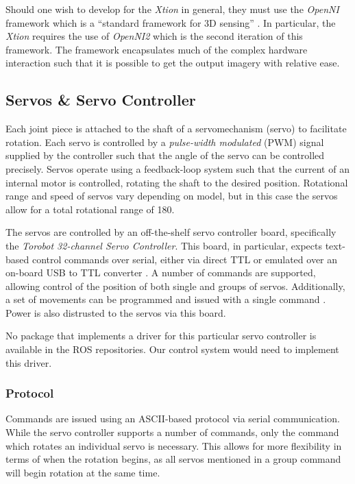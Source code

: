 Should one wish to develop for the \emph{Xtion} in general, they must use the \emph{OpenNI} framework which is a ``standard framework for 3D sensing'' \cite{openni_site}. In particular, the \emph{Xtion} requires the use of \emph{OpenNI2} which is the second iteration of this framework. The framework encapsulates much of the complex hardware interaction such that it is possible to get the output imagery with relative ease. 

\subsection{Servos \& Servo Controller}
Each joint piece is attached to the shaft of a servomechanism (servo) to facilitate rotation. Each servo is controlled by a \emph{pulse-width modulated} (PWM) signal supplied by the controller such that the angle of the servo can be controlled precisely. Servos operate using a feedback-loop system such that the current of an internal motor is controlled, rotating the shaft to the desired position. Rotational range and speed of servos vary depending on model, but in this case the servos allow for a total rotational range of 180\textdegree.

The servos are controlled by an off-the-shelf servo controller board, specifically the \emph{Torobot 32-channel Servo Controller}. This board, in particular, expects text-based control commands over serial, either via direct TTL or emulated over an on-board USB to TTL converter \cite{torobot_manual}. A number of commands are supported, allowing control of the position of both single and groups of servos. Additionally, a set of movements can be programmed and issued with a single command \cite{torobot_manual}. Power is also distrusted to the servos via this board.

No package that implements a driver for this particular servo controller is available in the ROS repositories. Our control system would need to implement this driver.

\subsubsection{Protocol}

Commands are issued using an ASCII-based protocol via serial communication. While the servo controller supports a number of commands, only the command which rotates an individual servo is necessary. This allows for more flexibility in terms of when the rotation begins, as all servos mentioned in a group command will begin rotation at the same time.

